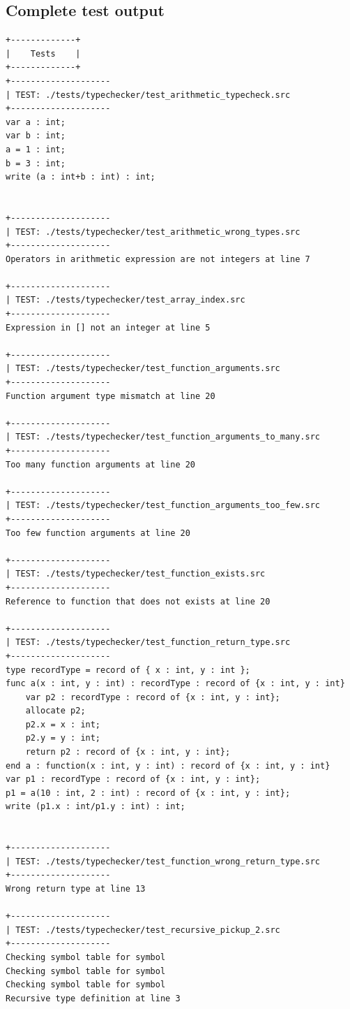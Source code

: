 \documentclass[a4paper,10pt,titlepage]{report}
\begin{document}
\subsection{Complete test output}
\begin{lstlisting}
+-------------+
|    Tests    |
+-------------+
+--------------------
| TEST: ./tests/typechecker/test_arithmetic_typecheck.src
+--------------------
var a : int;
var b : int;
a = 1 : int;
b = 3 : int;
write (a : int+b : int) : int;

 
+--------------------
| TEST: ./tests/typechecker/test_arithmetic_wrong_types.src
+--------------------
Operators in arithmetic expression are not integers at line 7
 
+--------------------
| TEST: ./tests/typechecker/test_array_index.src
+--------------------
Expression in [] not an integer at line 5
 
+--------------------
| TEST: ./tests/typechecker/test_function_arguments.src
+--------------------
Function argument type mismatch at line 20
 
+--------------------
| TEST: ./tests/typechecker/test_function_arguments_to_many.src
+--------------------
Too many function arguments at line 20
 
+--------------------
| TEST: ./tests/typechecker/test_function_arguments_too_few.src
+--------------------
Too few function arguments at line 20
 
+--------------------
| TEST: ./tests/typechecker/test_function_exists.src
+--------------------
Reference to function that does not exists at line 20
 
+--------------------
| TEST: ./tests/typechecker/test_function_return_type.src
+--------------------
type recordType = record of { x : int, y : int };
func a(x : int, y : int) : recordType : record of {x : int, y : int}
    var p2 : recordType : record of {x : int, y : int};
    allocate p2;
    p2.x = x : int;
    p2.y = y : int;
    return p2 : record of {x : int, y : int};
end a : function(x : int, y : int) : record of {x : int, y : int}
var p1 : recordType : record of {x : int, y : int};
p1 = a(10 : int, 2 : int) : record of {x : int, y : int};
write (p1.x : int/p1.y : int) : int;

 
+--------------------
| TEST: ./tests/typechecker/test_function_wrong_return_type.src
+--------------------
Wrong return type at line 13
 
+--------------------
| TEST: ./tests/typechecker/test_recursive_pickup_2.src
+--------------------
Checking symbol table for symbol
Checking symbol table for symbol
Checking symbol table for symbol
Recursive type definition at line 3
 

\end{lstlisting}
\end{document}
